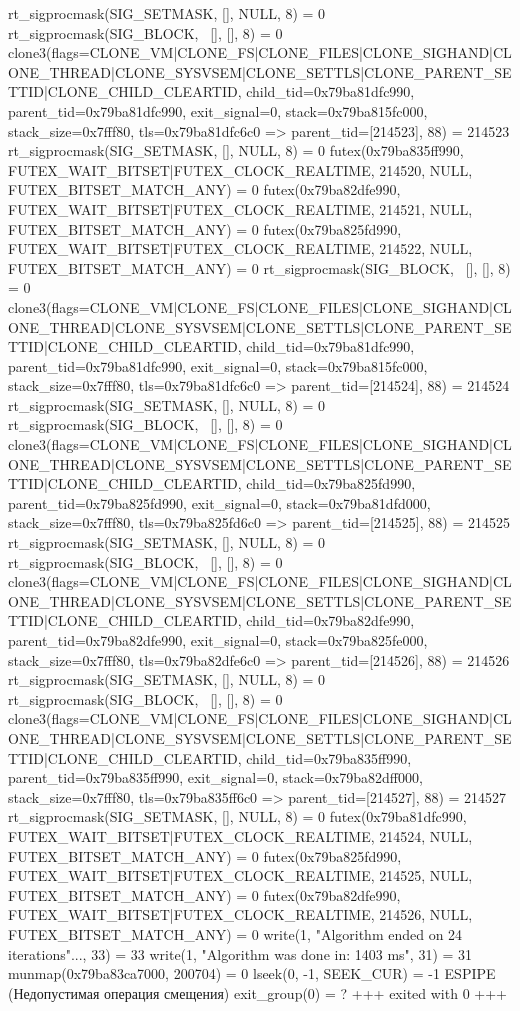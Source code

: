 \begin{breakableverbatim}
rt_sigprocmask(SIG_SETMASK, [], NULL, 8) = 0
rt_sigprocmask(SIG_BLOCK, ~[], [], 8)   = 0
clone3({flags=CLONE_VM|CLONE_FS|CLONE_FILES|CLONE_SIGHAND|CLONE_THREAD|CLONE_SYSVSEM|CLONE_SETTLS|CLONE_PARENT_SETTID|CLONE_CHILD_CLEARTID, child_tid=0x79ba81dfc990, parent_tid=0x79ba81dfc990, exit_signal=0, stack=0x79ba815fc000, stack_size=0x7fff80, tls=0x79ba81dfc6c0} => {parent_tid=[214523]}, 88) = 214523
rt_sigprocmask(SIG_SETMASK, [], NULL, 8) = 0
futex(0x79ba835ff990, FUTEX_WAIT_BITSET|FUTEX_CLOCK_REALTIME, 214520, NULL, FUTEX_BITSET_MATCH_ANY) = 0
futex(0x79ba82dfe990, FUTEX_WAIT_BITSET|FUTEX_CLOCK_REALTIME, 214521, NULL, FUTEX_BITSET_MATCH_ANY) = 0
futex(0x79ba825fd990, FUTEX_WAIT_BITSET|FUTEX_CLOCK_REALTIME, 214522, NULL, FUTEX_BITSET_MATCH_ANY) = 0
rt_sigprocmask(SIG_BLOCK, ~[], [], 8)   = 0
clone3({flags=CLONE_VM|CLONE_FS|CLONE_FILES|CLONE_SIGHAND|CLONE_THREAD|CLONE_SYSVSEM|CLONE_SETTLS|CLONE_PARENT_SETTID|CLONE_CHILD_CLEARTID, child_tid=0x79ba81dfc990, parent_tid=0x79ba81dfc990, exit_signal=0, stack=0x79ba815fc000, stack_size=0x7fff80, tls=0x79ba81dfc6c0} => {parent_tid=[214524]}, 88) = 214524
rt_sigprocmask(SIG_SETMASK, [], NULL, 8) = 0
rt_sigprocmask(SIG_BLOCK, ~[], [], 8)   = 0
clone3({flags=CLONE_VM|CLONE_FS|CLONE_FILES|CLONE_SIGHAND|CLONE_THREAD|CLONE_SYSVSEM|CLONE_SETTLS|CLONE_PARENT_SETTID|CLONE_CHILD_CLEARTID, child_tid=0x79ba825fd990, parent_tid=0x79ba825fd990, exit_signal=0, stack=0x79ba81dfd000, stack_size=0x7fff80, tls=0x79ba825fd6c0} => {parent_tid=[214525]}, 88) = 214525
rt_sigprocmask(SIG_SETMASK, [], NULL, 8) = 0
rt_sigprocmask(SIG_BLOCK, ~[], [], 8)   = 0
clone3({flags=CLONE_VM|CLONE_FS|CLONE_FILES|CLONE_SIGHAND|CLONE_THREAD|CLONE_SYSVSEM|CLONE_SETTLS|CLONE_PARENT_SETTID|CLONE_CHILD_CLEARTID, child_tid=0x79ba82dfe990, parent_tid=0x79ba82dfe990, exit_signal=0, stack=0x79ba825fe000, stack_size=0x7fff80, tls=0x79ba82dfe6c0} => {parent_tid=[214526]}, 88) = 214526
rt_sigprocmask(SIG_SETMASK, [], NULL, 8) = 0
rt_sigprocmask(SIG_BLOCK, ~[], [], 8)   = 0
clone3({flags=CLONE_VM|CLONE_FS|CLONE_FILES|CLONE_SIGHAND|CLONE_THREAD|CLONE_SYSVSEM|CLONE_SETTLS|CLONE_PARENT_SETTID|CLONE_CHILD_CLEARTID, child_tid=0x79ba835ff990, parent_tid=0x79ba835ff990, exit_signal=0, stack=0x79ba82dff000, stack_size=0x7fff80, tls=0x79ba835ff6c0} => {parent_tid=[214527]}, 88) = 214527
rt_sigprocmask(SIG_SETMASK, [], NULL, 8) = 0
futex(0x79ba81dfc990, FUTEX_WAIT_BITSET|FUTEX_CLOCK_REALTIME, 214524, NULL, FUTEX_BITSET_MATCH_ANY) = 0
futex(0x79ba825fd990, FUTEX_WAIT_BITSET|FUTEX_CLOCK_REALTIME, 214525, NULL, FUTEX_BITSET_MATCH_ANY) = 0
futex(0x79ba82dfe990, FUTEX_WAIT_BITSET|FUTEX_CLOCK_REALTIME, 214526, NULL, FUTEX_BITSET_MATCH_ANY) = 0
write(1, "Algorithm ended on 24 iterations"..., 33) = 33
write(1, "Algorithm was done in: 1403 ms\n", 31) = 31
munmap(0x79ba83ca7000, 200704)          = 0
lseek(0, -1, SEEK_CUR)                  = -1 ESPIPE (Недопустимая операция смещения)
exit_group(0)                           = ?
+++ exited with 0 +++
\end{breakableverbatim}
